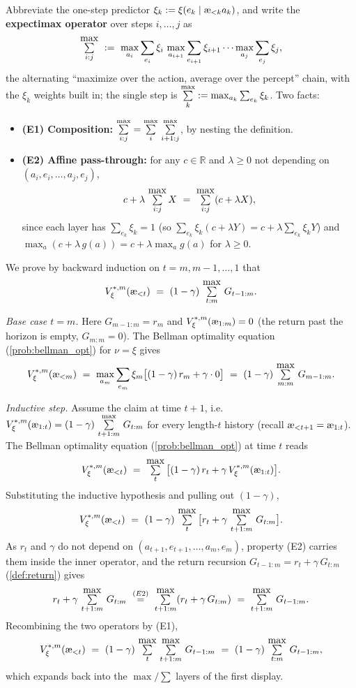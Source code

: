 \documentclass[fontsize=11pt, parskip=half]{scrartcl}
\theoremstyle{definition}
\newenvironment{solution}{%
    \begin{tcolorbox}[colback=black!5!white, colframe=black!50!white,
      title={\textbf{Solution}}, fonttitle=\normalfont, breakable]
  }{\end{tcolorbox}}
\newenvironment{solution}{\expandafter\comment}{\expandafter\endcomment}
\newcommand{\exmaxsym}{\mathop{\mathchoice
  {\overset{\textstyle\max}{\textstyle\sum}}%
  {\overset{\max}{\sum}}%
  {\overset{\scriptstyle\max}{\scriptstyle\sum}}%
  {\overset{\scriptscriptstyle\max}{\scriptscriptstyle\sum}}}}
\newcommand{\exmax}{\exmaxsym\limits}
\newcommand{\aes}{\textnormal{\ae}}
\begin{document}
\begin{solution}
Abbreviate the one-step predictor $\xi_k := \xi(e_k \mid \aes_{<k} a_k)$, and write the \textbf{expectimax operator} over steps $i, \ldots, j$ as
\[
    \exmax_{i:j} ~:=~ \max_{a_i} \sum_{e_i} \xi_i\, \max_{a_{i+1}} \sum_{e_{i+1}} \xi_{i+1} \cdots \max_{a_j} \sum_{e_j} \xi_j,
\]
the alternating ``maximize over the action, average over the percept'' chain, with the $\xi_k$ weights built in; the single step is $\exmax_k := \max_{a_k} \sum_{e_k} \xi_k$. Two facts:
\begin{itemize}\itemsep=2pt
    \item \textbf{(E1) Composition:} $\exmax_{i:j} = \exmax_i\, \exmax_{i+1:j}$, by nesting the definition.
    \item \textbf{(E2) Affine pass-through:} for any $c \in \mathbb{R}$ and $\lambda \geq 0$ not depending on $(a_i, e_i, \ldots, a_j, e_j)$,
    \[
        c + \lambda\, \exmax_{i:j} X ~=~ \exmax_{i:j}(c + \lambda X),
    \]
    since each layer has $\sum_{e_k} \xi_k = 1$ (so $\sum_{e_k}\xi_k(c+\lambda Y) = c + \lambda \sum_{e_k}\xi_k Y$) and $\max_a(c + \lambda\, g(a)) = c + \lambda \max_a g(a)$ for $\lambda \geq 0$.
\end{itemize}

We prove by backward induction on $t = m, m-1, \ldots, 1$ that
\[
    V_\xi^{*,m}(\aes_{<t}) ~=~ (1-\gamma)\, \exmax_{t:m}\, G_{t-1:m}.
\]

\emph{Base case $t = m$.} Here $G_{m-1:m} = r_m$ and $V_\xi^{*,m}(\aes_{1:m}) = 0$ (the return past the horizon is empty, $G_{m:m} = 0$). The Bellman optimality equation (\cref{prob:bellman_opt}) for $\nu = \xi$ gives
\[
    V_\xi^{*,m}(\aes_{<m}) ~=~ \max_{a_m} \sum_{e_m} \xi_m \big[(1-\gamma)\, r_m + \gamma \cdot 0\big] ~=~ (1-\gamma)\, \exmax_{m:m}\, G_{m-1:m}.
\]

\emph{Inductive step.} Assume the claim at time $t+1$, i.e.\ $V_\xi^{*,m}(\aes_{1:t}) = (1-\gamma)\, \exmax_{t+1:m}\, G_{t:m}$ for every length-$t$ history (recall $\aes_{<t+1} = \aes_{1:t}$). The Bellman optimality equation (\cref{prob:bellman_opt}) at time $t$ reads
\[
    V_\xi^{*,m}(\aes_{<t}) ~=~ \exmax_t \big[(1-\gamma)\, r_t + \gamma\, V_\xi^{*,m}(\aes_{1:t})\big].
\]
Substituting the inductive hypothesis and pulling out $(1-\gamma)$,
\[
    V_\xi^{*,m}(\aes_{<t}) ~=~ (1-\gamma)\, \exmax_t \big[r_t + \gamma\, \exmax_{t+1:m}\, G_{t:m}\big].
\]
As $r_t$ and $\gamma$ do not depend on $(a_{t+1}, e_{t+1}, \ldots, a_m, e_m)$, property (E2) carries them inside the inner operator, and the return recursion $G_{t-1:m} = r_t + \gamma\, G_{t:m}$ (\cref{def:return}) gives
\[
    r_t + \gamma\, \exmax_{t+1:m}\, G_{t:m} ~\overset{(E2)}{=}~ \exmax_{t+1:m}(r_t + \gamma\, G_{t:m}) ~=~ \exmax_{t+1:m}\, G_{t-1:m}.
\]
Recombining the two operators by (E1),
\[
    V_\xi^{*,m}(\aes_{<t}) ~=~ (1-\gamma)\, \exmax_t\, \exmax_{t+1:m}\, G_{t-1:m} ~=~ (1-\gamma)\, \exmax_{t:m}\, G_{t-1:m},
\]
which expands back into the $\max/\sum$ layers of the first display.


\end{solution}
\end{document}
